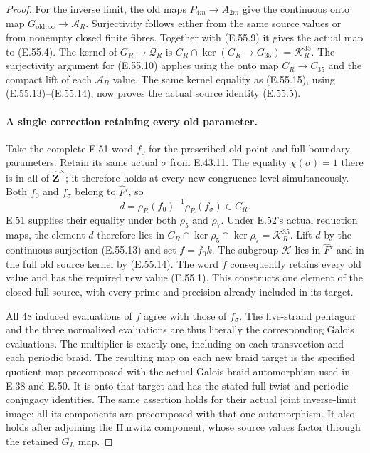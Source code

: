 \begin{proof}
For the inverse limit, the old maps
$P_{4m}\to A_{2m}$ give the continuous onto map
$G_{\mathrm{old},\infty}\to\mathcal A_R$.
Surjectivity follows either from the same source
values or from nonempty closed finite fibres.
Together with \textup{(E.55.9)} it gives the actual
map to \textup{(E.55.4)}. The kernel of
$G_R\to\mathcal Q_R$ is
$C_R\cap\ker(G_R\to G_{35})=\mathcal K_R^{35}$.
The surjectivity argument for
\textup{(E.55.10)} applies using the onto map
$C_R\to C_{35}$ and the compact lift of each
$\mathcal A_R$ value.
The same kernel equality as
\textup{(E.55.15)}, using
\textup{(E.55.13)--(E.55.14)}, now proves the
actual source identity \textup{(E.55.5)}.

\paragraph{A single correction retaining every old parameter.}
Take the complete E.51 word $f_0$ for the prescribed
old point and full boundary parameters. Retain its
same actual $\sigma$ from E.43.11.
The equality $\chi(\sigma)=1$ there is in all of
$\widehat{\mathbf Z}^{\times}$; it therefore holds
at every new congruence level simultaneously.
Both $f_0$ and $f_\sigma$ belong to $\widehat F'$,
so
\[
       d=\rho_R(f_0)^{-1}\rho_R(f_\sigma)\in C_R.
 \tag{E.55.16}
\]
E.51 supplies their equality under both $\rho_5$
and $\rho_7$. Under E.52's actual reduction maps,
the element $d$ therefore lies in
$C_R\cap\ker\rho_5\cap\ker\rho_7
=\mathcal K_R^{35}$.
Lift $d$ by the continuous surjection
\textup{(E.55.13)} and set $f=f_0k$.
The subgroup $\mathscr K$ lies in $\widehat F'$
and in the full old source kernel by
\textup{(E.55.14)}. The word $f$ consequently
retains every old value and has the required
new value \textup{(E.55.1)}.
This constructs one element of the closed full
source, with every prime and precision already
included in its target.

All $48$ induced evaluations of $f$ agree with
those of $f_\sigma$. The five-strand pentagon
and the three normalized evaluations are thus
literally the corresponding Galois evaluations.
The multiplier is exactly one, including on
each transvection and each periodic braid.
The resulting map on each new braid target is
the specified quotient map precomposed with
the actual Galois braid automorphism used in
E.38 and E.50. It is onto that target and has
the stated full-twist and periodic conjugacy
identities. The same assertion holds for their
actual joint inverse-limit image: all its
components are precomposed with that one
automorphism. It also holds after adjoining
the Hurwitz component, whose source values
factor through the retained $G_L$ map.


\end{proof}
